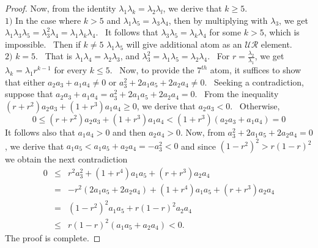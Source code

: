 \documentclass[10pt,a4paper]{amsart}
\begin{document}
\begin{proof}
Now, from the identity $\lambda_1\lambda_k=\lambda_2\lambda_l$, we derive that $k\ge 5$.\\
$1)$ In the case where $k>5$ and  $\lambda_1\lambda_5=\lambda_3\lambda_4$, then by multiplying with $\lambda_3$, we get  
$ \lambda_1\lambda_3\lambda_5=\lambda_3^2\lambda_4=\lambda_1\lambda_k\lambda_4$. \ It follows that  $ \lambda_3\lambda_5=\lambda_k\lambda_4$ for some  $k> 5$, which is impossible. \ Then if $k\ne 5$ $\lambda_1\lambda_5$ will give additional atom as an $\mathcal{UR}$ element. \\
$2)$ $k=5$. \ That is $\lambda_1\lambda_4=\lambda_2\lambda_3$, and
$\lambda_3^2=\lambda_1\lambda_5=\lambda_2\lambda_4$. \ For $r=\frac{\lambda_2}{\lambda_1}$, we get $\lambda_k=\lambda_1r^{k-1}$ for every $k\le 5$. \ Now, to provide the $7^{th}$ atom, it suffices to show that either    $ a_2a_3+a_1a_4\ne 0$ or $a_3^2+2a_1a_5+2a_2a_4\ne 0$. \ Seeking a contradiction, suppose that  $ a_2a_3+a_1a_4=a_3^2+2a_1a_5+2a_2a_4= 0$. \ From the inequality $ (r+r^2)a_2a_3+(1+r^3) a_1a_4\ge 0$, we derive that $a_2a_3<0$. \ Otherwise,
$$ 0\le (r+r^2)a_2a_3+(1+r^3) a_1a_4< (1+r^3)(a_2a_3+ a_1a_4 )= 0$$
It follows also that $a_1a_4>0 $ and then   $a_2a_4>0.$
Now, from 
$a_3^2+2a_1a_5+2a_2a_4=0$, we derive that $a_1a_5<a_1a_5+a_2a_4=-a_3^2<0$ and since 
$(1-r^2)^2>r(1-r)^2$ we obtain the next contradiction
$$\begin{array}{lll} 0 & \le & r^2a_3^2+(1+r^4)a_1a_5+(r+r^3)a_2a_4 \\
&=&-r^2(2a_1a_5+2a_2a_4) +(1+r^4)a_1a_5+(r+r^3)a_2a_4 \\
& = &    (1-r^2)^2a_1a_5+r(1-r)^2a_2a_4 \\
&\le & r(1-r)^2(a_1a_5+a_2a_4) < 0.
\end{array}$$
The proof is complete.
\end{proof}
\end{document}
